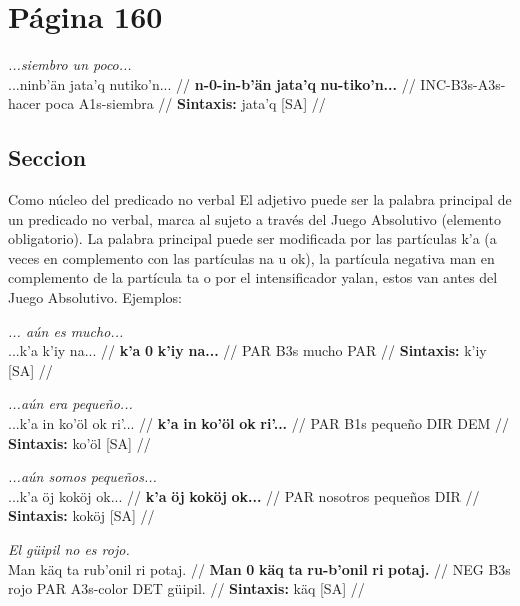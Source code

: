 \documentclass{article}%
\begin{document}
%
\section{Página 160}%
\label{sec:Pgina160}%
\par\medskip%
\ex
\textit{...siembro un poco...} \\
\begingl
\gla ...ninb'än jata'q nutiko'n... //
\glb \textbf{n-}\textbf{0-}\textbf{in-}\textbf{b'än} \textbf{jata'q} \textbf{nu-}\textbf{tiko'n...} //
\glc INC-B3s-A3s-hacer poca A1s-siembra //
\glft \textbf{Sintaxis:} jata'q [\textsc{SA}] //
\endgl
\xe
%
\medskip%
\subsection{Seccion}%
\label{subsec:Seccion}%

%
Como núcleo del predicado no verbal %
El adjetivo puede ser la palabra principal de un predicado no verbal, marca al sujeto a %
través del Juego Absolutivo (elemento obligatorio). La palabra principal puede ser %
modificada por las partículas k'a (a veces en complemento con las partículas na u ok), %
la partícula negativa man en complemento de la partícula ta o por el intensificador %
yalan, estos van antes del Juego Absolutivo. Ejemplos: %
\par\medskip%
\ex
\textit{... aún es mucho...} \\
\begingl
\gla ...k'a k'iy na... //
\glb \textbf{k'a} \textbf{0} \textbf{k'iy} \textbf{na...} //
\glc PAR B3s mucho PAR //
\glft \textbf{Sintaxis:} k'iy [\textsc{SA}] //
\endgl
\xe
%
\medskip%
\par\medskip%
\ex
\textit{...aún era pequeño...} \\
\begingl
\gla ...k'a in ko'öl ok ri'... //
\glb \textbf{k'a} \textbf{in} \textbf{ko'öl} \textbf{ok} \textbf{ri'...} //
\glc PAR B1s pequeño DIR DEM //
\glft \textbf{Sintaxis:} ko'öl [\textsc{SA}] //
\endgl
\xe
%
\medskip%
\par\medskip%
\ex
\textit{...aún somos pequeños...} \\
\begingl
\gla ...k'a öj koköj ok... //
\glb \textbf{k'a} \textbf{öj} \textbf{koköj} \textbf{ok...} //
\glc PAR nosotros pequeños DIR //
\glft \textbf{Sintaxis:} koköj [\textsc{SA}] //
\endgl
\xe
%
\medskip%
\par\medskip%
\ex
\textit{El güipil no es rojo.} \\
\begingl
\gla Man käq ta rub'onil ri potaj. //
\glb \textbf{Man} \textbf{0} \textbf{käq} \textbf{ta} \textbf{ru-}\textbf{b'onil} \textbf{ri} \textbf{potaj.} //
\glc NEG B3s rojo PAR A3s-color DET güipil. //
\glft \textbf{Sintaxis:} käq [\textsc{SA}] //
\endgl
\xe
%
\medskip

%
\end{document}
